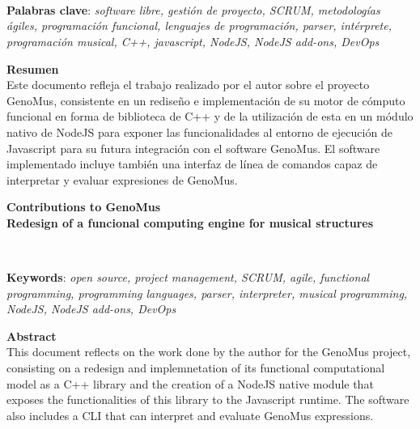 \thispagestyle{empty}

\begin{center}
{\large\bfseries \titulo \\ \subtitulo }\\
\end{center}
\begin{center}
\autor\\
\end{center}


\vspace{0.5cm}
\noindent\textbf{Palabras clave}: \textit{software libre, gestión de proyecto, SCRUM, metodologías ágiles, programación funcional, lenguajes de programación, parser, intérprete, programación musical, C++, javascript, NodeJS, NodeJS add-ons, DevOps}
\vspace{0.7cm}

\noindent\textbf{Resumen}\\
Este documento refleja el trabajo realizado por el autor sobre el proyecto GenoMus, consistente en un rediseño e implementación de su motor de cómputo funcional en forma de biblioteca de C++ y de la utilización de esta en un módulo nativo de NodeJS para exponer las funcionalidades al entorno de ejecución de Javascript para su futura integración con el software GenoMus. El software implementado incluye también una interfaz de línea de comandos capaz de interpretar y evaluar expresiones de GenoMus.

\cleardoublepage

\begin{center}
	{\large\bfseries Contributions to GenoMus\\ Redesign of a funcional computing engine for musical structures}\\
\end{center}
\begin{center}
	\autor\\
\end{center}
\vspace{0.5cm}
\noindent\textbf{Keywords}: \textit{open source, project management, SCRUM, agile, functional programming, programming languages, parser, interpreter, musical programming, NodeJS, NodeJS add-ons, DevOps }
\vspace{0.7cm}

\noindent\textbf{Abstract}\\
This document reflects on the work done by the author for the GenoMus project, consisting on a redesign and implemnetation of its functional computational model as a C++ library and the creation of a NodeJS native module that exposes the functionalities of this library to the Javascript runtime. The software also includes a CLI that can interpret and evaluate GenoMus expressions.


